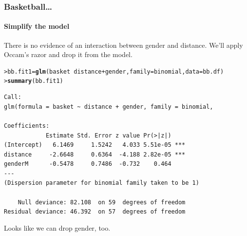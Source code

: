 \documentclass{beamer}\usepackage[]{graphicx}\usepackage[]{xcolor}
\makeatletter
\newcommand{\hlopt}[1]{\textcolor[rgb]{0,0,0}{#1}}%
\newcommand{\hlstd}[1]{\textcolor[rgb]{0.345,0.345,0.345}{#1}}%
\newcommand{\hlkwb}[1]{\textcolor[rgb]{0.69,0.353,0.396}{#1}}%
\newcommand{\hlkwc}[1]{\textcolor[rgb]{0.333,0.667,0.333}{#1}}%
\newcommand{\hlkwd}[1]{\textcolor[rgb]{0.737,0.353,0.396}{\textbf{#1}}}%
\newenvironment{kframe}{%
 \def\at@end@of@kframe{}%
 \ifinner\ifhmode%
  \def\at@end@of@kframe{\end{minipage}}%
  \begin{minipage}{\columnwidth}%
 \fi\fi%
 \def\FrameCommand##1{\hskip\@totalleftmargin \hskip-\fboxsep
 \colorbox{shadecolor}{##1}\hskip-\fboxsep
     \hskip-\linewidth \hskip-\@totalleftmargin \hskip\columnwidth}%
 \MakeFramed {\advance\hsize-\width
   \@totalleftmargin\z@ \linewidth\hsize
   \@setminipage}}%
 {\par\unskip\endMakeFramed%
 \at@end@of@kframe}
\newenvironment{knitrout}{}{} %
\makeatother
\begin{document}
\begin{frame}[fragile]
\frametitle{Basketball\ldots}
\framesubtitle{Simplify the model}
There is no evidence of an interaction between gender and distance. We'll apply Occam's razor and drop it from the model.
\bigskip

\begin{knitrout}\scriptsize
{}\color{fgcolor}\begin{kframe}
\begin{alltt}
\hlstd{> }\hlstd{bb.fit1} \hlkwb{=} \hlkwd{glm}\hlstd{(basket} \hlopt{~} \hlstd{distance} \hlopt{+} \hlstd{gender,} \hlkwc{family} \hlstd{= binomial,} \hlkwc{data} \hlstd{= bb.df)}
\hlstd{> }\hlkwd{summary}\hlstd{(bb.fit1)}
\end{alltt}
\end{kframe}
\end{knitrout}

\begin{knitrout}\scriptsize
{}\color{fgcolor}\begin{kframe}
\begin{verbatim}
Call:
glm(formula = basket ~ distance + gender, family = binomial, 

Coefficients:
            Estimate Std. Error z value Pr(>|z|)    
(Intercept)   6.1469     1.5242   4.033 5.51e-05 ***
distance     -2.6648     0.6364  -4.188 2.82e-05 ***
genderM      -0.5478     0.7486  -0.732    0.464    
---
(Dispersion parameter for binomial family taken to be 1)

    Null deviance: 82.108  on 59  degrees of freedom
Residual deviance: 46.392  on 57  degrees of freedom
\end{verbatim}
\end{kframe}
\end{knitrout}

Looks like we can drop gender, too.

\end{frame}
\end{document}
